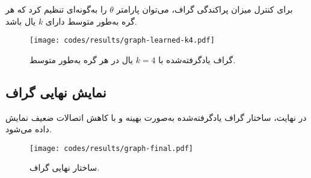 \documentclass[10pt,twocolumn,a4paper]{article}
\begin{document}
	برای کنترل میزان پراکندگی گراف، می‌توان پارامتر \( \theta \) را به‌گونه‌ای تنظیم کرد که هر گره به‌طور متوسط دارای \( k \) یال باشد. 
	
	\begin{latin}
		
	\end{latin}
	
	
	\begin{figure}[H]
		\centering
		\texttt{[image: codes/results/graph-learned-k4.pdf]}
		\caption{گراف یادگرفته‌شده با \( k = 4 \) یال در هر گره به‌طور متوسط.}
		\label{fig:graph-learned-k4}
	\end{figure}
	
	\subsection{نمایش نهایی گراف}
	در نهایت، ساختار گراف یادگرفته‌شده به‌صورت بهینه و با کاهش اتصالات ضعیف نمایش داده می‌شود.
	
	\begin{latin}
		
	\end{latin}
	
	
	\begin{figure}[H]
		\centering
		\texttt{[image: codes/results/graph-final.pdf]}
		\caption{ساختار نهایی گراف.}
		\label{fig:graph-final}
	\end{figure}
	
	
	
	
	
\end{document}
